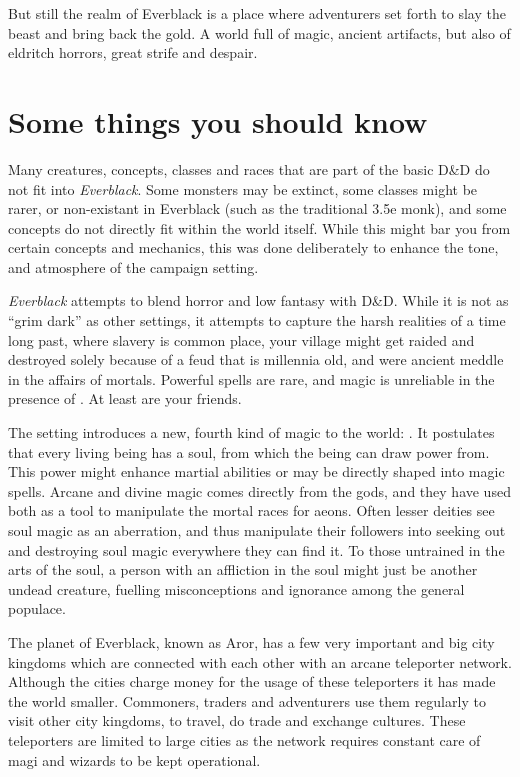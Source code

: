 But still the realm of Everblack is a place where adventurers set forth to
slay the beast and bring back the gold. A world full of magic, ancient
artifacts, but also of eldritch horrors, great strife and despair.

\section{Some things you should know}

\begin{enumerate}
  Many creatures, concepts, classes and
 races that are part of the basic D\&D do not fit into \emph{Everblack}. Some
 monsters may be extinct, some classes might be rarer, or non-existant in
 Everblack (such as the traditional 3.5e monk), and some concepts do not
 directly fit within the world itself. While this might bar you from certain
 concepts and mechanics, this was done deliberately to enhance the tone, and
 atmosphere of the campaign setting.

  \emph{Everblack} attempts to blend horror and low fantasy
 with D\&D. While it is not as ``grim dark'' as other settings, it attempts to
 capture the harsh realities of a time long past, where slavery is common place,
 your village might get raided and destroyed solely because of a feud that is
 millennia old, and were ancient  meddle in the affairs
 of mortals. Powerful spells are rare, and magic is unreliable in the presence
 of . At least  are your friends.

  The setting introduces a new, fourth kind of magic to the
 world: . It postulates that every living being has a
 soul, from which the being can draw power from. This power might enhance
 martial abilities or may be directly shaped into magic spells. Arcane and
 divine magic comes directly from the gods, and they have used both as a tool
 to manipulate the mortal races for aeons. Often lesser deities see soul magic
 as an aberration, and thus manipulate their followers into seeking out and
 destroying soul magic everywhere they can find it. To those untrained in the
 arts of the soul, a person with an affliction in the soul might just be
 another undead creature, fuelling misconceptions and ignorance among the
 general populace.

  The planet of Everblack, known as Aror, has a
 few very important and big city kingdoms which are connected with each other
 with an arcane teleporter network. Although the cities charge money for the
 usage of these teleporters it has made the world smaller. Commoners, traders
 and adventurers use them regularly to visit other city kingdoms, to travel,
 do trade and exchange cultures. These teleporters are limited to large cities
 as the network requires constant care of magi and wizards to be kept
 operational.


\end{enumerate}
